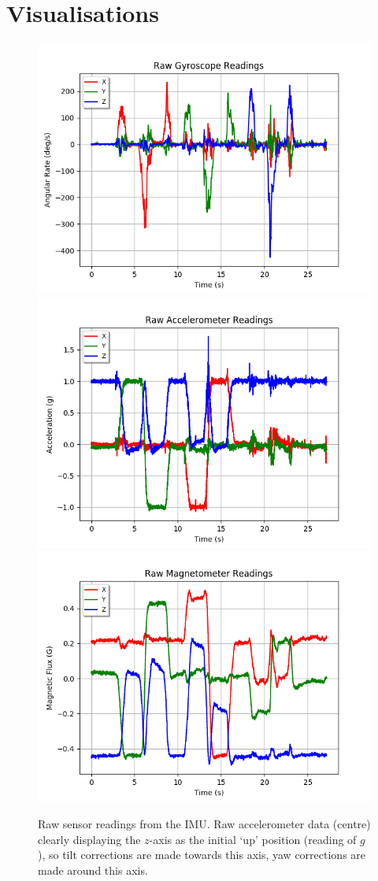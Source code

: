 \documentclass[11pt]{article}
\begin{document}
\section*{Visualisations}

\begin{figure}[htp]

\centering
\includegraphics[width=.32\textwidth]{gyro-unaltered}\hfill
\includegraphics[width=.32\textwidth]{acc-unaltered}\hfill
\includegraphics[width=.32\textwidth]{mag-unaltered}

\caption{Raw sensor readings from the IMU. Raw accelerometer data (centre) clearly displaying the $z$-axis as the initial `up' position (reading of $g$), so tilt corrections are made towards this axis, yaw corrections are made around this axis.}
\label{fig:raw-readings}

\end{figure}
\end{document}
